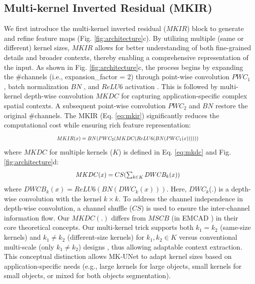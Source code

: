 \subsection{Multi-kernel Inverted Residual (MKIR)} 
We first introduce the multi-kernel inverted residual ($MKIR$) block to generate and refine feature maps (Fig. \ref{fig:architecture}c). By utilizing multiple (same or different) kernel sizes, $MKIR$ allows for better understanding of both fine-grained details and broader contexts, thereby enabling a comprehensive representation of the input. As shown in Fig. \ref{fig:architecture}c, the process begins by expanding the \#channels (i.e., expansion\_factor = 2) through point-wise convolution $PWC_1$, batch normalization $BN$ \cite{ioffe2015batch}, and $ReLU6$ activation \cite{krizhevsky2010convolutional}. This is followed by multi-kernel depth-wise convolution $MKDC$ for capturing application-specific complex spatial contexts. A subsequent point-wise convolution $PWC_2$ and $BN$ restore the original \#channels. The MKIR (Eq. \ref{eq:mkir}) significantly reduces the computational cost while ensuring rich feature representation: %
\begin{equation}
\scalebox{0.75}{\(
    MKIR(x) = BN(PWC_2(MKDC(ReLU6(BN(PWC_1(x))))))
\)}
    \label{eq:mkir}
\end{equation}
where $MKDC$ for multiple kernels ($K$) is defined in Eq. \ref{eq:mkdc} and Fig. \ref{fig:architecture}d: %
\begin{equation}
    \scalebox{0.9}{\( 
    MKDC(x) = CS(\sum_{k \in K} DWCB_{k}(x))
    \)}
    \label{eq:mkdc}
\end{equation}
where $DWCB_{k}(x) = ReLU6(BN(DWC_{k}(x)))$. Here, $DWC_{k}$(.) is a depth-wise convolution with the kernel $k\times k$. To address the channel independence in depth-wise convolution, a channel shuffle ($CS$) is used to ensure the inter-channel information flow. Our $MKDC(.)$ differs from $MSCB$ (in EMCAD \cite{rahman2024emcad}) in their core theoretical concepts. Our multi-kernel trick supports both $k_1=k_2$ (same-size kernels) and $k_1 \neq k_2$ (different-size kernels) for $k_1, k_2 \in K$ versus conventional multi-scale (only $k_1 \neq k_2$) designs \cite{rahman2024emcad, lin2023scale, seo2022spatial}, thus allowing adaptable context extraction.
This conceptual distinction allows MK-UNet to adapt kernel sizes based on application-specific needs (e.g., large kernels for large objects, small kernels for small objects, or mixed for both objects segmentation).  %
